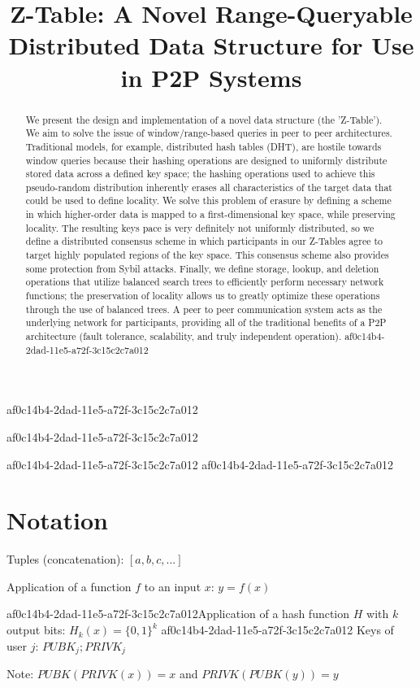\documentclass[12pt]{article}
\title{Z-Table: A Novel Range-Queryable Distributed Data Structure for Use in P2P Systems}
\begin{document}
af0c14b4-2dad-11e5-a72f-3c15c2c7a012
\maketitle
af0c14b4-2dad-11e5-a72f-3c15c2c7a012
\begin{abstract}
We present the design and implementation of a novel data structure (the 'Z-Table'). We aim to solve the issue of window/range-based queries in peer to peer architectures. Traditional models, for example,  distributed hash tables (DHT), are hostile towards window queries because their hashing operations are designed to uniformly distribute stored data across a defined key space; the hashing operations used to achieve this pseudo-random distribution inherently erases all characteristics of the target data that could be used to define locality. We solve this problem of erasure by defining a scheme in which higher-order data is mapped to a first-dimensional key space, while preserving locality. The resulting keys pace is very definitely not uniformly distributed, so we define a distributed consensus scheme in which participants in our Z-Tables agree to target highly populated regions of the key space. This consensus scheme also provides some protection from Sybil attacks. Finally, we define storage, lookup, and deletion operations that utilize balanced search trees to efficiently perform necessary network functions; the preservation of locality allows us to greatly optimize these operations through the use of balanced trees. A peer to peer communication system acts as the underlying network for participants, providing all of the traditional benefits of a P2P architecture (fault tolerance, scalability, and truly independent operation).
af0c14b4-2dad-11e5-a72f-3c15c2c7a012\end{abstract}
af0c14b4-2dad-11e5-a72f-3c15c2c7a012
af0c14b4-2dad-11e5-a72f-3c15c2c7a012\section{Notation}

Tuples (concatenation): $[a,b,c,...]$

Application of a function $f$ to an input $x$: $y=f(x)$

af0c14b4-2dad-11e5-a72f-3c15c2c7a012Application of a hash function $H$ with $k$ output bits: $H_{k}(x) = \{0,1\}^k$
af0c14b4-2dad-11e5-a72f-3c15c2c7a012
Keys of user $j$: $ PUBK_j; PRIVK_j $

Note: $PUBK(PRIVK(x)) = x$ and $PRIVK(PUBK(y)) = y$~
\end{document}
